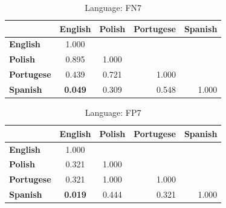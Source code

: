 \begin{table}
    \small
    \centering
    \begin{tabular}{lcccc}
        \toprule
                           & \multicolumn{1}{l}{\textbf{English}}   & \multicolumn{1}{l}{\textbf{Polish}} & \textbf{Portugese}        & \textbf{Spanish}          \\
        \midrule
        \textbf{English}   & 1.000                                  & \multicolumn{1}{l}{}                &                           &                           \\
        \textbf{Polish}    & 0.895                                  & 1.000                               &                           &                           \\
        \textbf{Portugese} & 0.439                                  & 0.721                               & \multicolumn{1}{r}{1.000} &                           \\
        \textbf{Spanish}   & \cellcolor[HTML]{EFEFEF}\textbf{0.049} & 0.309                               & \multicolumn{1}{r}{0.548} & \multicolumn{1}{r}{1.000} \\
        \bottomrule
    \end{tabular}
    \caption{Language: FN7}
\end{table}

\begin{table}
    \small
    \centering
    \begin{tabular}{lcccc}
        \toprule
                           & \multicolumn{1}{l}{\textbf{English}}   & \multicolumn{1}{l}{\textbf{Polish}} & \textbf{Portugese}        & \textbf{Spanish}          \\
        \midrule
        \textbf{English}   & 1.000                                  & \multicolumn{1}{l}{}                &                           &                           \\
        \textbf{Polish}    & 0.321                                  & 1.000                               &                           &                           \\
        \textbf{Portugese} & 0.321                                  & 1.000                               & \multicolumn{1}{r}{1.000} &                           \\
        \textbf{Spanish}   & \cellcolor[HTML]{EFEFEF}\textbf{0.019} & 0.444                               & \multicolumn{1}{r}{0.321} & \multicolumn{1}{r}{1.000} \\
        \bottomrule
    \end{tabular}
    \caption{Language: FP7}
\end{table}


